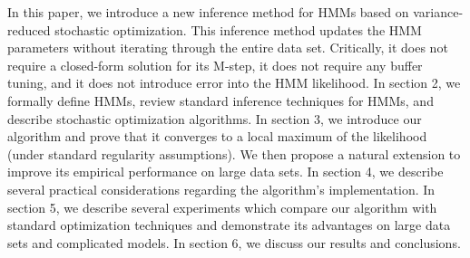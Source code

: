 In this paper, we introduce a new inference method for HMMs based on variance-reduced stochastic optimization. This inference method updates the HMM parameters without iterating through the entire data set. Critically, it does not require a closed-form solution for its M-step, it does not require any buffer tuning, and it does not introduce error into the HMM likelihood. In section 2, we formally define HMMs, review standard inference techniques for HMMs, and describe stochastic optimization algorithms. In section 3, we introduce our algorithm and prove that it converges to a local maximum of the likelihood (under standard regularity assumptions). We then propose a natural extension to improve its empirical performance on large data sets. In section 4, we describe several practical considerations regarding the algorithm's implementation. In section 5, we describe several experiments which compare our algorithm with standard optimization techniques and demonstrate its advantages on large data sets and complicated models. In section 6, we discuss our results and conclusions.



